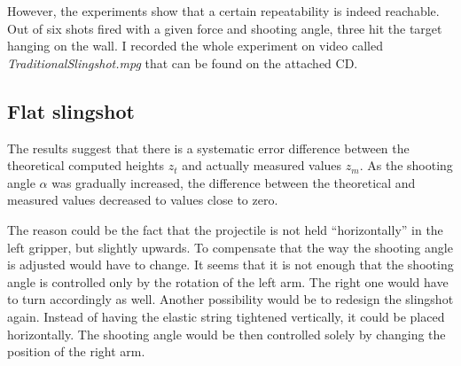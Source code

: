 			However, the experiments show that a certain repeatability is indeed reachable. Out of six shots fired with a given force and shooting angle, three hit the target hanging on the wall. I recorded the whole experiment on video called \textit{TraditionalSlingshot.mpg} that can be found on the attached CD.

		\subsection{Flat slingshot}
			The results suggest that there is a systematic error difference between the theoretical computed heights $z_t$ and actually measured values $z_m$. As the shooting angle $\alpha$ was gradually increased, the difference between the theoretical and measured values decreased to values close to zero.

			The reason could be the fact that the projectile is not held ``horizontally'' in the left gripper, but slightly upwards. To compensate that the way the shooting angle is adjusted would have to change. It seems that it is not enough that the shooting angle is controlled only by the rotation of the left arm. The right one would have to turn accordingly as well. Another possibility would be to redesign the slingshot again. Instead of having the elastic string tightened vertically, it could be placed horizontally. The shooting angle would be then controlled solely by changing the position of the right arm.
		
		
	
			
			
			